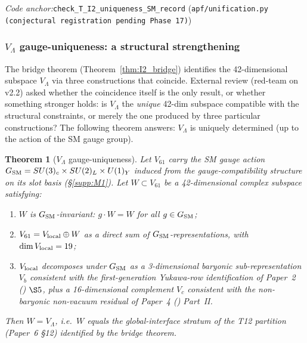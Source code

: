 \documentclass[11pt]{article}
\theoremstyle{plain}
\newtheorem{theorem}{Theorem}[section]
\theoremstyle{definition}
\theoremstyle{remark}
\newcommand{\paperref}[2]{Paper~#1 (\emph{#2})}
\newcommand{\coderef}[2]{\par\noindent\textit{Code anchor:}\quad\texttt{#1} (\texttt{#2})}
\begin{document}
\coderef{check\_T\_I2\_uniqueness\_SM\_record}{apf/unification.py (conjectural registration pending Phase 17)}

\bigskip

\subsubsection*{$V_\Lambda$ gauge-uniqueness: a structural strengthening}

\noindent The bridge theorem (Theorem~\ref{thm:I2_bridge}) identifies the 42-dimensional subspace $V_\Lambda$ via three constructions that coincide.  External review (red-team on v2.2) asked whether the coincidence itself is the only result, or whether something stronger holds: is $V_\Lambda$ the \emph{unique} 42-dim subspace compatible with the structural constraints, or merely the one produced by three particular constructions?  The following theorem answers: $V_\Lambda$ is uniquely determined (up to the action of the SM gauge group).

\begin{theorem}[$V_\Lambda$ gauge-uniqueness]\label{thm:V_Lambda_gauge_uniqueness}
Let $V_{61}$ carry the SM gauge action $G_{\rm SM} = SU(3)_c \times SU(2)_L \times U(1)_Y$ induced from the gauge-compatibility structure on its slot basis (\S\ref{supp:M1}).  Let $W \subset V_{61}$ be a 42-dimensional complex subspace satisfying:
\begin{enumerate}[leftmargin=2.5em,label=\textup{(\alph*)},itemsep=3pt]
  \item $W$ is $G_{\rm SM}$-invariant: $g \cdot W = W$ for all $g \in G_{\rm SM}$;
  \item $V_{61} = V_{\rm local} \oplus W$ as a direct sum of $G_{\rm SM}$-representations, with $\dim V_{\rm local} = 19$;
  \item $V_{\rm local}$ decomposes under $G_{\rm SM}$ as a 3-dimensional baryonic sub-representation $V_b$ consistent with the first-generation Yukawa-row identification of \paperref{2}{} $\S 5$, plus a 16-dimensional complement $V_c$ consistent with the non-baryonic non-vacuum residual of \paperref{4}{} Part~II.
\end{enumerate}
Then $W = V_\Lambda$, i.e.\ $W$ equals the global-interface stratum of the T12 partition (Paper~6 \S12) identified by the bridge theorem.
\end{theorem}
\end{document}
